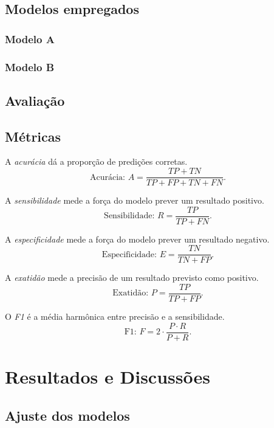 \documentclass[9pt, a4paper, twocolumn]{article}
\begin{document}
\subsection{Modelos empregados}

\lipsum[9]

\subsubsection{Modelo A}

\lipsum[10]

\subsubsection{Modelo B}

\lipsum[11]

\subsection{Avaliação}

\lipsum[12]

\subsection{Métricas}

A \emph{acurácia} dá a proporção de predições corretas.
$$
\text{Acurácia: } A = \frac{TP + TN}{TP + FP + TN + FN}.
$$

A \emph{sensibilidade} mede a força do modelo prever um resultado
positivo.
$$
\text{Sensibilidade: } R = \frac{TP}{TP + FN}.
$$

A \emph{especificidade} mede a força do modelo prever um resultado
negativo.
$$
\text{Especificidade: } E = \frac{TN}{TN + FP}.
$$

A \emph{exatidão} mede a precisão de um resultado previsto como
positivo.
$$
\text{Exatidão: } P = \frac{TP}{TP + FP}.
$$

O \emph{F1} é a média harmônica entre precisão e a sensibilidade.
$$
\text{F1: } F = 2\cdot\frac{P\cdot R}{P + R}.
$$


\section{Resultados e Discussões}

\lipsum[13]

\subsection{Ajuste dos modelos}
\end{document}
